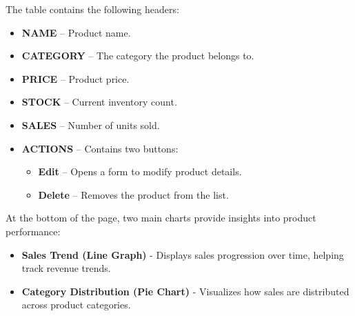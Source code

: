 \documentclass[11pt,a4paper]{article}
\begin{document}
The table contains the following headers:
\begin{itemize}
\item \textbf{NAME} – Product name.
\item \textbf{CATEGORY} – The category the product belongs to.
\item \textbf{PRICE} – Product price.
\item \textbf{STOCK} – Current inventory count.
\item \textbf{SALES} – Number of units sold.
\item \textbf{ACTIONS} – Contains two buttons:
\begin{itemize}
\item \textbf{Edit} – Opens a form to modify product details.
\item \textbf{Delete} – Removes the product from the list.
\end{itemize}
\end{itemize}
At the bottom of the page, two main charts provide insights into product performance:
\begin{itemize}
\item \textbf{Sales Trend (Line Graph)} - Displays sales progression over time, helping track revenue trends.
\item \textbf{Category Distribution (Pie Chart)} - Visualizes how sales are distributed across product categories.
\end{itemize}
\end{document}

